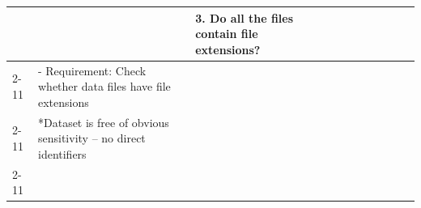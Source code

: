 \begin{table}[]
\begin{tabular}{|l|l|l|lllll|l|l|l|}
                                                               &                                                                                                                                         & 3. Do all the files contain file extensions?                                                                                                 & \multicolumn{1}{l|}{}                                       & \multicolumn{1}{l|}{}                                                                           & \multicolumn{1}{l|}{}                                                                            & \multicolumn{1}{l|}{}                                                            &                                                             &                                                                                            &                                        &                     \\ \cline{2-11} 
                                                               & - Requirement: Check whether data files have file extensions                                                                            &                                                                                                                                              & \multicolumn{1}{l|}{}                                       & \multicolumn{1}{l|}{}                                                                           & \multicolumn{1}{l|}{}                                                                            & \multicolumn{1}{l|}{}                                                            &                                                             &                                                                                            &                                        &                     \\ \cline{2-11} 
                                                               & *Dataset is free of obvious sensitivity – no direct identifiers                                                                         &                                                                                                                                              & \multicolumn{1}{l|}{}                                       & \multicolumn{1}{l|}{}                                                                           & \multicolumn{1}{l|}{}                                                                            & \multicolumn{1}{l|}{}                                                            &                                                             &                                                                                            &                                        &                     \\ \cline{2-11} 

\end{tabular}
\end{table}
